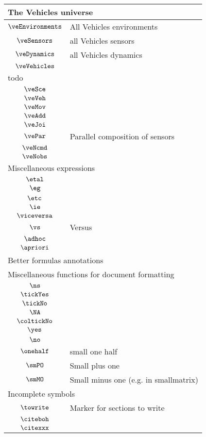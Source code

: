 \begin{longtable}{cl}
 \multicolumn{2}{l}{The Vehicles universe}\\ 
 \hline
$\veEnvironments$ &  All Vehicles environments \\ 
 $\veSensors$ &  all Vehicles sensors\\ 
 $\veDynamics$ &  all Vehicles dynamics\\ 
 $\veVehicles$ & \\ 
 \multicolumn{2}{l}{todo}\\ 
 \hline
$\veSce$ & \\ 
 $\veVeh$ & \\ 
 $\veMov$ & \\ 
 $\veAdd$ & \\ 
 $\veJoi$ & \\ 
 $\vePar$ &  Parallel composition of sensors\\ 
 $\veNcmd$ & \\ 
 $\veNobs$ & \\ 
 \multicolumn{2}{l}{Miscellaneous expressions}\\ 
 \hline
$\etal$ & \\ 
 $\eg$ & \\ 
 $\etc$ & \\ 
 $\ie$ & \\ 
 $\viceversa$ & \\ 
 $\vs$ &  Versus\\ 
 $\adhoc$ & \\ 
 $\apriori$ & \\ 
 \multicolumn{2}{l}{Better formulas annotations}\\ 
 \hline
\multicolumn{2}{l}{Miscellaneous functions for document formatting}\\ 
 \hline
$\ns$ & \\ 
 $\tickYes$ & \\ 
 $\tickNo$ & \\ 
 $\NA$ & \\ 
 $\coltickNo$ & \\ 
 $\yes$ & \\ 
 $\no$ & \\ 
 $\onehalf$ &  small one half\\ 
 $\smPO$ &  Small plus one \\ 
 $\smMO$ &  Small minus one (e.g. in smallmatrix)\\ 
 \multicolumn{2}{l}{Incomplete symbols}\\ 
 \hline
$\towrite$ &  Marker for sections to write\\ 
 $\citeboh$ & \\ 
 $\citexxx$ & \\ 

\end{longtable}
